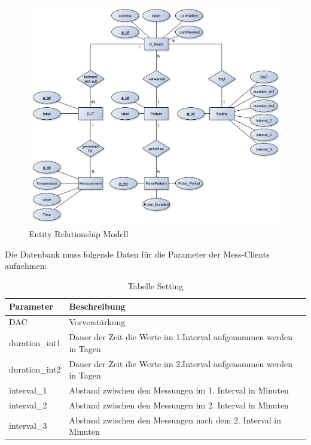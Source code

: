 \begin{figure}[H]
\begin{center}
\includegraphics[width=\textwidth]{img/general/ER_Diagramm.pdf}
\caption{Entity Relationship Modell}
\label{ERM}
\end{center}
\end{figure}


Die Datenbank muss folgende Daten für die Parameter der Mess-Clients aufnehmen:\\

\begin{table}[H]
\begin{center}
\begin{tabular}{|l|l|}\hline
Parameter & Beschreibung \\ \hline
DAC & Vorverstärkung\\ 
duration\_int1 & Dauer der Zeit die Werte im 1.Interval aufgenommen werden in Tagen\\ 
duration\_int2 & Dauer der Zeit die Werte im 2.Interval aufgenommen werden in Tagen\\ 
interval\_1 & Abstand zwischen den Messungen im 1. Interval in Minuten\\ 
interval\_2 & Abstand zwischen den Messungen im 2. Interval in Minuten\\ 
interval\_3 & Abstand zwischen den Messungen nach dem 2. Interval in Minuten\\ \hline
\end{tabular}
\caption{Tabelle Setting}
\label{table_TabelleSetting}
\end{center}
\end{table}




